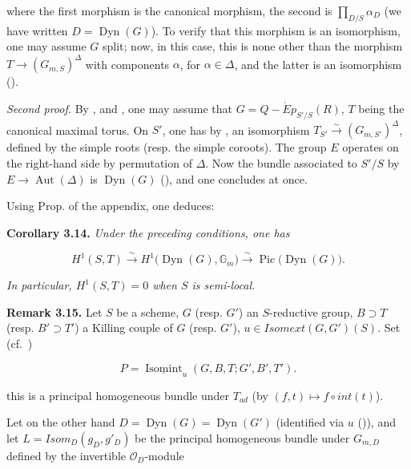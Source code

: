 where the first morphism is the canonical morphism, the second is \(\prod_{D/S} \alpha_{D}\) (we have written \(D =
\operatorname{Dyn}(G)\)). To verify that this morphism is an isomorphism, one may assume \(G\) split; now, in this case, this is none
other than the morphism \(T \to (G_{m, S})^{\Delta}\) with components \(\alpha\), for \(\alpha \in \Delta\), and the latter is
an isomorphism ().

\emph{Second proof.} By ,  and , one may assume that \(G = Q-\acute{E}p_{S'/S}(R)\), \(T\) being the canonical maximal
torus. On \(S'\), one has by , an isomorphism \(T_{S'} \xrightarrow{\sim} (G_{m, S'})^{\Delta}\), defined by
the simple roots (resp. the simple coroots). The group \(E\) operates on the right-hand side by permutation of \(\Delta\).
Now the bundle associated to \(S'/S\) by \(E \to \operatorname{Aut}(\Delta)\) is \(\operatorname{Dyn}(G)\) (), and one concludes at once.

Using Prop.  of the appendix, one deduces:

\textbf{Corollary 3.14.} \emph{Under the preceding conditions, one has}

\[
  H^1(S,T)\xrightarrow{\sim}
  H^1\bigl(\operatorname{Dyn}(G),\mathbb G_m\bigr)
  \xrightarrow{\sim}\operatorname{Pic}\bigl(\operatorname{Dyn}(G)\bigr).
\]

\emph{In particular, \(H^{1}(S, T) = 0\) when \(S\) is semi-local.}

\textbf{Remark 3.15.} Let \(S\) be a scheme, \(G\) (resp. \(G'\)) an \(S\)-reductive group, \(B \supset T\) (resp. \(B' \supset T'\)) a
Killing couple of \(G\) (resp. \(G'\)), \(u \in Isomext(G, G')(S)\). Set (cf.~)

\[
  P=\underline{\operatorname{Isomint}}_u(G,B,T;G',B',T').
\]

this is a principal homogeneous bundle under \(T_{ad}\) (by \((f, t) \mapsto f \circ int(t)\)).

Let on the other hand \(D = \operatorname{Dyn}(G) = \operatorname{Dyn}(G')\) (identified via \(u\) ()), and let \(L = Isom_{D}(g_{D}, g'_{D})\) be the
principal homogeneous bundle under \(G_{m,D}\) defined by the invertible \(\mathcal O_D\)-module

